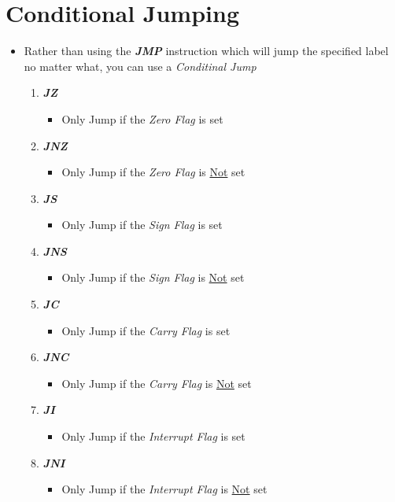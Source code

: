 \documentclass{article}
\begin{document}
\section{Conditional Jumping}
\begin{itemize}
  \item{Rather than using the \textbf{\textit{JMP}} instruction which will jump the specified label no matter what, you can use a \textit{Conditinal Jump}}
  \begin{enumerate}
    \item{\textbf{\textit{JZ}}}
    \begin{itemize}
      \item{Only Jump if the \textit{Zero Flag} is set}
    \end{itemize}
    \item{\textbf{\textit{JNZ}}}
    \begin{itemize}
      \item{Only Jump if the \textit{Zero Flag} is \underline{Not} set}
    \end{itemize}
    \item{\textbf{\textit{JS}}}
    \begin{itemize}
      \item{Only Jump if the \textit{Sign Flag} is set}
    \end{itemize}
    \item{\textbf{\textit{JNS}}}
    \begin{itemize}
      \item{Only Jump if the \textit{Sign Flag} is \underline{Not} set}
    \end{itemize}
    \item{\textbf{\textit{JC}}}
    \begin{itemize}
      \item{Only Jump if the \textit{Carry Flag} is set}
    \end{itemize}
    \item{\textbf{\textit{JNC}}}
    \begin{itemize}
      \item{Only Jump if the \textit{Carry Flag} is \underline{Not} set}
    \end{itemize}
    \item{\textbf{\textit{JI}}}
    \begin{itemize}
      \item{Only Jump if the \textit{Interrupt Flag} is set}
    \end{itemize}
    \item{\textbf{\textit{JNI}}}
    \begin{itemize}
      \item{Only Jump if the \textit{Interrupt Flag} is \underline{Not} set}
    \end{itemize}
  \end{enumerate}
\end{itemize}
\end{document}
